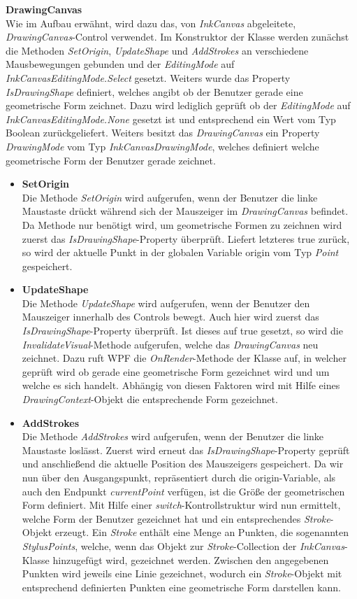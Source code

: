 \textbf{DrawingCanvas}\\
Wie im Aufbau erwähnt, wird dazu das, von \textit{InkCanvas} abgeleitete, \textit{DrawingCanvas}-Control verwendet. Im Konstruktor der Klasse werden zunächst die Methoden \textit{SetOrigin}, \textit{UpdateShape} und \textit{AddStrokes} an verschiedene Mausbewegungen gebunden und der \textit{EditingMode} auf \textit{InkCanvasEditingMode.Select} gesetzt. Weiters wurde das Property \textit{IsDrawingShape} definiert, welches angibt ob der Benutzer gerade eine geometrische Form zeichnet. Dazu wird lediglich geprüft ob der \textit{EditingMode} auf \textit{InkCanvasEditingMode.None} gesetzt ist und entsprechend ein Wert vom Typ Boolean zurückgeliefert. Weiters besitzt das \textit{DrawingCanvas} ein Property \textit{DrawingMode} vom Typ \textit{InkCanvasDrawingMode}, welches definiert welche geometrische Form der Benutzer gerade zeichnet.
\begin{itemize}
\item \textbf{SetOrigin}\\
Die Methode \textit{SetOrigin} wird aufgerufen, wenn der Benutzer die linke Maustaste drückt während sich der Mauszeiger im \textit{DrawingCanvas} befindet. Da Methode nur benötigt wird, um geometrische Formen zu zeichnen wird zuerst das \textit{IsDrawingShape}-Property überprüft. Liefert letzteres true zurück, so wird der aktuelle Punkt in der globalen Variable origin vom Typ \textit{Point} gespeichert.
\item \textbf{UpdateShape}\\
Die Methode \textit{UpdateShape} wird aufgerufen, wenn der Benutzer den Mauszeiger innerhalb des Controls bewegt. Auch hier wird zuerst das \textit{IsDrawingShape}-Property überprüft. Ist dieses auf true gesetzt, so wird die \textit{InvalidateVisual}-Methode aufgerufen, welche das \textit{DrawingCanvas} neu zeichnet. Dazu ruft WPF die \textit{OnRender}-Methode der Klasse auf, in welcher geprüft wird ob gerade eine geometrische Form gezeichnet wird und um welche es sich handelt. Abhängig von diesen Faktoren wird mit Hilfe eines \textit{DrawingContext}-Objekt die entsprechende Form gezeichnet.
\item \textbf{AddStrokes}\\
Die Methode \textit{AddStrokes} wird aufgerufen, wenn der Benutzer die linke Maustaste loslässt. Zuerst wird erneut das \textit{IsDrawingShape}-Property geprüft und anschließend die aktuelle Position des Mauszeigers gespeichert. Da wir nun über den Ausgangspunkt, repräsentiert durch die origin-Variable, als auch den Endpunkt \textit{currentPoint} verfügen, ist die Größe der geometrischen Form definiert.
Mit Hilfe einer \textit{switch}-Kontrollstruktur wird nun ermittelt, welche Form der Benutzer gezeichnet hat und ein entsprechendes \textit{Stroke}-Objekt erzeugt. Ein \textit{Stroke} enthält eine Menge an Punkten, die sogenannten \textit{StylusPoints}, welche, wenn das Objekt zur \textit{Stroke}-Collection der \textit{InkCanvas}-Klasse hinzugefügt wird, gezeichnet werden. Zwischen den angegebenen Punkten wird jeweils eine Linie gezeichnet, wodurch ein \textit{Stroke}-Objekt mit entsprechend definierten Punkten eine geometrische Form darstellen kann.
\end{itemize}

